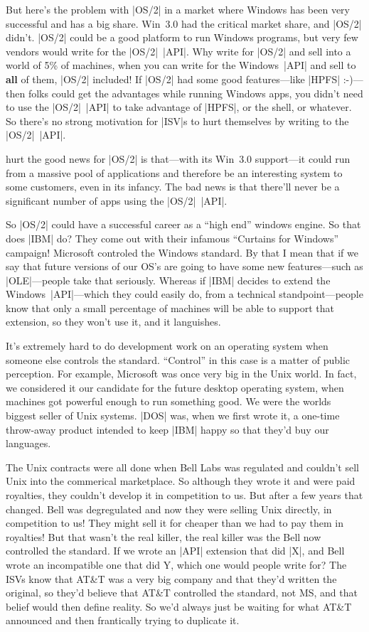 But here's the problem with |OS/2| in a market where Windows has been
very successful and has a big share.  Win~3.0 had the critical
market share, and |OS/2| didn't.  |OS/2| could be a good platform to run
Windows programs, but very few vendors would write for the |OS/2|~|API|.
Why write for |OS/2| and sell into a world of 5\% of machines, when
you can write for the Windows~|API| and sell to {\bf all} of them, |OS/2| included!
If |OS/2| had some good features---like |HPFS| :-)---then folks could get
the advantages while running Windows apps, you didn't need to use
the |OS/2|~|API| to take advantage of |HPFS|, or the shell, or whatever.  
So there's no strong
motivation for |ISV|s to hurt themselves by writing to the |OS/2|~|API|.

hurt the good news for |OS/2| is that---with its Win~3.0 support---it could
run from a massive pool of applications and therefore be an interesting
system to some customers, even in its infancy.  The bad news is that
there'll never be a significant number of apps using the |OS/2|~|API|.  

So |OS/2| could have a successful career as a ``high end'' windows engine.
So that does |IBM| do?  They come out with their infamous ``Curtains for
Windows'' campaign!  Microsoft controled the Windows standard.  By that
I mean that if we say that future versions of our OS's are going to
have some new features---such as |OLE|---people take that seriously.
Whereas if |IBM| decides to extend the Windows~|API|---which they could
easily do, from a technical standpoint---people know that only a small
percentage of machines will be able to support that extension, so they
won't use it, and it languishes.

It's extremely hard to do development work on an operating system when
someone else controls the standard.  ``Control'' in this case is a matter
of public perception.  For example, Microsoft was once very big in the 
Unix world.  In fact, we considered it our candidate for the future
desktop operating system, when machines got powerful enough to run something
good.  We were the worlds biggest seller of Unix systems.  |DOS| was, 
when we first wrote it, a one-time throw-away product intended to
keep |IBM| happy so that they'd buy our languages.

The Unix contracts were all done when Bell Labs was regulated and couldn't
sell Unix into the commerical marketplace.  So although they wrote it
and were paid royalties, they couldn't develop it in competition to us.
But after a few years that changed.  Bell was degregulated and now they
were selling Unix directly, in competition to us!  They might sell it for
cheaper than we had to pay them in royalties!  But that wasn't the real
killer, the real killer was the Bell now controlled the standard.  If
we wrote an |API| extension that did |X|, and Bell wrote an incompatible one
that did Y, which one would people write for?  The ISVs know that AT\&T
was a very big company and that they'd written the original, so they'd
believe that AT\&T controlled the standard, not MS, and that belief would
then define reality.  So we'd always just be waiting for what AT\&T announced
and then frantically trying to duplicate it.

